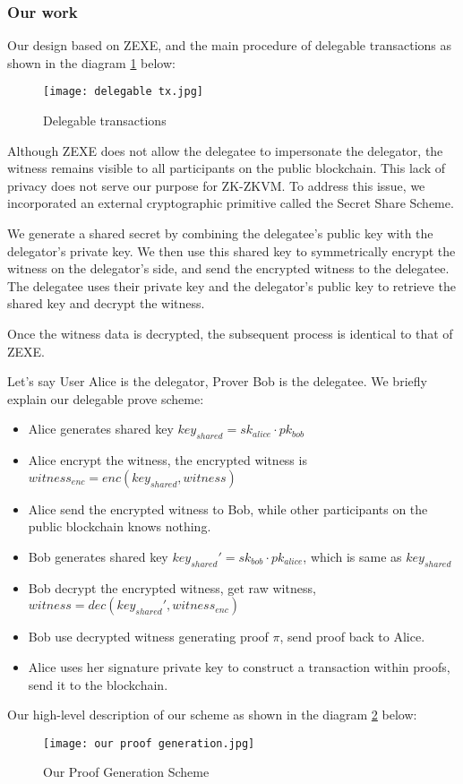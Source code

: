 \subsubsection{Our work}

Our design based on ZEXE, and the main procedure of delegable transactions as shown in the diagram \ref{fig:delegable_tx} below:

\begin{figure}[!ht]
    \centering
    \texttt{[image: delegable tx.jpg]}
    \caption{Delegable transactions}
    \label{fig:delegable_tx}
\end{figure}

Although ZEXE does not allow the delegatee to impersonate the delegator, the witness remains visible to all participants on the public blockchain. This lack of privacy does not serve our purpose for ZK-ZKVM. To address this issue, we incorporated an external cryptographic primitive called the Secret Share Scheme.

We generate a shared secret by combining the delegatee's public key with the delegator's private key. We then use this shared key to symmetrically encrypt the witness on the delegator's side, and send the encrypted witness to the delegatee. The delegatee uses their private key and the delegator's public key to retrieve the shared key and decrypt the witness.

Once the witness data is decrypted, the subsequent process is identical to that of ZEXE.

Let's say User Alice is the delegator, Prover Bob is the delegatee. We briefly explain our delegable prove scheme:
\color{blue!50!black}
\begin{itemize}
    \item Alice generates shared key $key_{shared} = sk_{alice} \cdot pk_{bob}$
    \item Alice encrypt the witness, the encrypted witness is $witness_{enc} = enc(key_{shared}, witness)$
    \item Alice send the encrypted witness to Bob, while other participants on the public blockchain knows nothing.
    \item Bob generates shared key $key_{shared}' = sk_{bob} \cdot pk_{alice}$, which is same as $key_{shared}$
    \item Bob decrypt the encrypted witness, get raw witness, $witness = dec(key_{shared}', witness_{enc})$
    \item Bob use decrypted witness generating proof $\pi$, send proof back to Alice.
    \item Alice uses her signature private key to construct a transaction within proofs, send it to the blockchain.
\end{itemize}
\normalcolor{}

Our high-level description of our scheme as shown in the diagram \ref{fig:our_proof_generation} below:
\begin{figure}[!ht]
    \centering
    \texttt{[image: our proof generation.jpg]}
    \caption{Our Proof Generation Scheme}
    \label{fig:our_proof_generation}
\end{figure} 